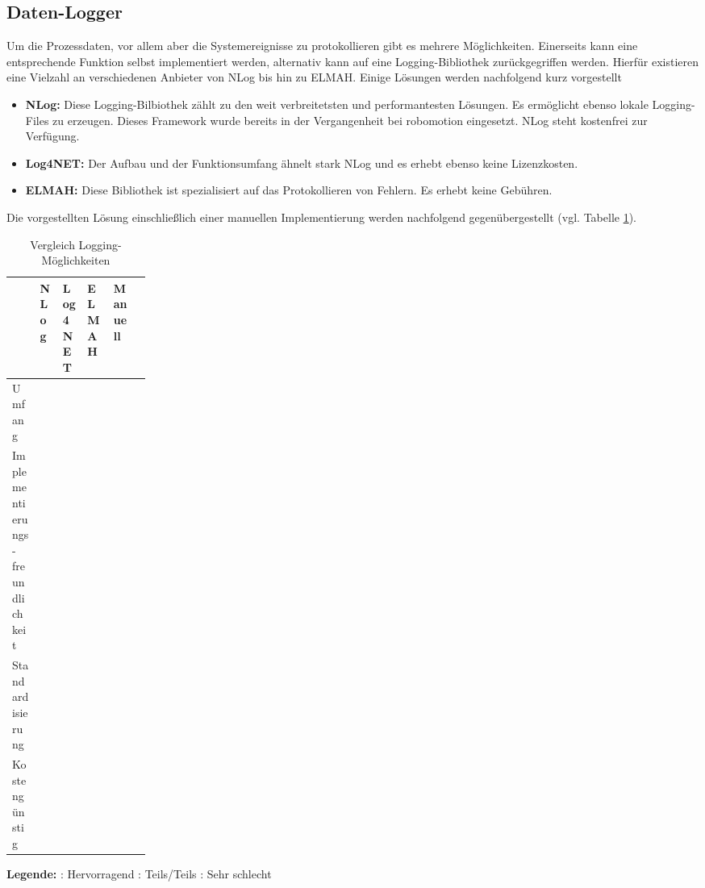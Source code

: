 \documentclass[ a4paper,
                oneside,
                toc=bibliography,
                toc=listof
                ]{scrbook}
\begin{document}
   	\subsection{Daten-Logger}
   	Um die Prozessdaten, vor allem aber die Systemereignisse zu protokollieren gibt es mehrere Möglichkeiten. Einerseits kann eine entsprechende Funktion selbst implementiert werden, alternativ kann auf eine Logging-Bibliothek zurückgegriffen werden. Hierfür existieren eine Vielzahl an verschiedenen Anbieter von NLog bis hin zu ELMAH. \cite{logging} Einige Lösungen werden nachfolgend kurz vorgestellt
   	\begin{itemize}
   		\item \textbf{NLog:} Diese Logging-Bilbiothek zählt zu den weit verbreitetsten und performantesten Lösungen. Es ermöglicht ebenso lokale Logging-Files zu erzeugen. Dieses Framework wurde bereits in der Vergangenheit bei robomotion eingesetzt. NLog steht kostenfrei zur Verfügung.
   		\item \textbf{Log4NET:} Der Aufbau und der Funktionsumfang ähnelt stark NLog und es erhebt ebenso keine Lizenzkosten.
   		\item  \textbf{ELMAH:} Diese Bibliothek ist spezialisiert auf das Protokollieren von Fehlern. Es erhebt keine Gebühren. \cite{logging}
   	\end{itemize}
   	Die vorgestellten Lösung einschließlich einer manuellen Implementierung werden nachfolgend gegenübergestellt (vgl. Tabelle \ref{tab:Logger}).
   	\begin{table}[h]
   		\centering
   		\caption{Vergleich Logging-Möglichkeiten}
   		\label{tab:Logger}
   		\begin{tabularx}{\linewidth}{p{0.2\linewidth} >{\centering\arraybackslash}X >{\centering\arraybackslash}X >{\centering\arraybackslash}X >{\centering\arraybackslash}X >{\centering\arraybackslash}X}
   			\hline
   			\textbf{ }  & \textbf{NLog} & \textbf{Log4NET} &   \textbf{ELMAH} & \textbf{Manuell}\\
   			\hline
   			Umfang & \harveyBallThreeQuarter& \harveyBallThreeQuarter& \harveyBallHalf& \harveyBallFull\\
   			Implementierungs-freundlichkeit & \harveyBallThreeQuarter & \harveyBallHalf & \harveyBallHalf & \harveyBallNone\\
   			Standardisierung & \harveyBallThreeQuarter & \harveyBallNone & \harveyBallNone  & \harveyBallNone \\
   			Kostengünstig & \harveyBallFull & \harveyBallFull & \harveyBallFull & \harveyBallFull \\
   			\hline
   		\end{tabularx}
   		\begin{flushleft}
   			\textbf{Legende:} \harveyBallFull: Hervorragend   \harveyBallHalf: Teils/Teils	\harveyBallNone: Sehr schlecht
   		\end{flushleft}
   	\end{table}
\end{document}
